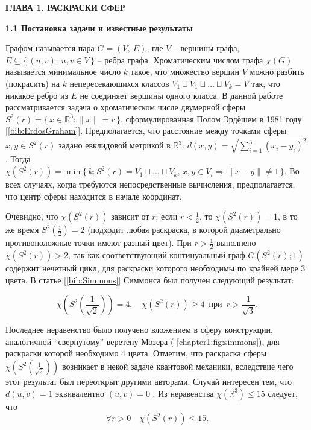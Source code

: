 \newpage
\begin{center}
\noindent\textbf{ГЛАВА 1. РАСКРАСКИ СФЕР}\label{chapters:1}
\vspace{1.5mm}
\end{center}

\vspace{5pt}
\textbf{1.1 Постановка задачи и известные результаты}\label{chapters:1.1}
\vspace{5pt}

Графом называется пара $G=(V,~E)$, где $V$ -- вершины графа, 
$E \subseteq \{\, (u,v) : \, u,v \in V \,\}$ -- ребра графа. 
Хроматическим числом графа $\chi(G)$ называется минимальное число $k$ такое, что множество вершин $V$ можно разбить (покрасить) на $k$ 
непересекающихся классов $V_1 \sqcup V_1 \sqcup \dots \sqcup V_k = V$ так, что никакое ребро из $E$ не соединяет вершины одного класса. 
В данной работе рассматривается задача о хроматическом числе двумерной сферы 
$S^2(r) = \{\, x \in \mathbb{R}^3 : \|x\| = r \,\}$, сформулированная Полом Эрдёшем в 1981 году [\ref{bib:ErdosGraham}].
Предполагается, что расстояние между точками сферы $x,y \in S^2(r)$ задано евклидовой метрикой в $\mathbb{R}^3$: 
$d(x,y) = \sqrt{\sum_{i=1}^{3}(x_i-y_i)^2}$. Тогда 
$\chi(S^2(r)) = \min \{\, k: S^2(r) = V_1 \sqcup \dots \sqcup V_k , \, x,y \in V_i \Rightarrow \|x - y\| \ne 1 \,\}$. 
Во всех случаях, когда требуются непосредственные вычисления, предполагается, что центр сферы находится в начале координат.

Очевидно, что $\chi(S^2(r))$ зависит от $r$: если $r < \tfrac{1}{2}$, то $\chi(S^2(r))=1$, в то же время 
$S^2\left(\tfrac{1}{2}\right) = 2$ (подходит любая раскраска, в которой диаметрально противоположные точки имеют разный цвет).
При $r > \tfrac{1}{2}$ выполнено $\chi(S^2(r))>2$, так как соответствующий континуальный граф $G(S^2(r); 1)$ содержит нечетный цикл, для раскраски которого необходимы по крайней мере $3$ цвета.
В статье [\ref{bib:Simmons}] Симмонса был получен следующий результат:

\begin{theorem1}[Симмонс, 1976]
$$ \chi\left(S^2\left(\frac{1}{\sqrt{2}}\right)\right)=4, 
\quad \chi(S^2(r)) \geq 4 \, \text{ при } \, r > \frac{1}{\sqrt{3}}. $$
\end{theorem1}

Последнее неравенство было получено вложением в сферу конструкции, аналогичной \enquote{свернутому} веретену Мозера (\figurename{ \ref{chapter1:fig:simmons}}), для раскраски которой необходимо $4$ цвета. 
Отметим, что раскраска сферы $\chi\left(S^2\left(\frac{1}{\sqrt{2}}\right)\right)$ возникает в некой задаче квантовой механики, вследствие чего этот результат был переоткрыт другими авторами. Случай интересен тем, что $d(u,v)=1$ эквивалентно $(u,v)=0$ .
Из неравенства $\chi(\mathbb{R}^3) \leq 15$ следует, что 
$$\forall r>0 \quad \chi(S^2(r)) \leq 15.$$

